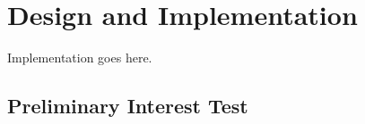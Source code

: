 \chapter{Design and Implementation}\label{ch:implementation}
Implementation goes here.

\section{Preliminary Interest Test}